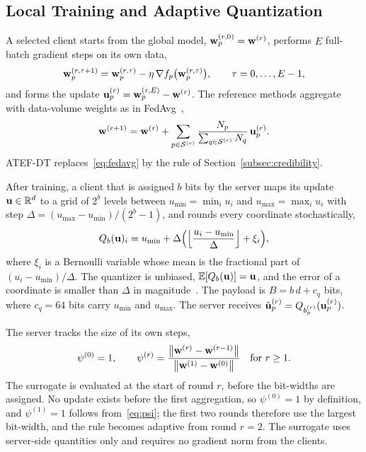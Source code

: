 \subsection{Local Training and Adaptive Quantization}
\label{subsec:quant}\label{subsec:local}
A selected client starts from the global model, $\mathbf{w}_p^{(r,0)}=\mathbf{w}^{(r)}$, performs $E$ full-batch gradient steps on its own data,
\begin{equation}
	\mathbf{w}_p^{(r,\tau+1)}=\mathbf{w}_p^{(r,\tau)}-\eta\,\nabla f_p\bigl(\mathbf{w}_p^{(r,\tau)}\bigr),\qquad \tau=0,\dots,E-1,
	\label{eq:local}
\end{equation}
and forms the update $\mathbf{u}_p^{(r)}=\mathbf{w}_p^{(r,E)}-\mathbf{w}^{(r)}$. The reference methods aggregate with data-volume weights as in FedAvg~\cite{mcmahan2017communication},
\begin{equation}
	\mathbf{w}^{(r+1)}=\mathbf{w}^{(r)}+\sum_{p\in\mathcal{S}^{(r)}}\frac{N_p}{\sum_{q\in\mathcal{S}^{(r)}}N_q}\,\mathbf{u}_p^{(r)} .
	\label{eq:fedavg}
\end{equation}
ATEF-DT replaces~\eqref{eq:fedavg} by the rule of Section~\ref{subsec:credibility}.

After training, a client that is assigned $b$ bits by the server maps its update $\mathbf{u}\in\mathbb{R}^d$ to a grid of $2^b$ levels between $u_{\min}=\min_i u_i$ and $u_{\max}=\max_i u_i$ with step $\Delta=(u_{\max}-u_{\min})/(2^b-1)$, and rounds every coordinate stochastically,
\begin{equation}
	Q_b(\mathbf{u})_i=u_{\min}+\Delta\Bigl(\Bigl\lfloor\frac{u_i-u_{\min}}{\Delta}\Bigr\rfloor+\xi_i\Bigr),
	\label{eq:quant}
\end{equation}
where $\xi_i$ is a Bernoulli variable whose mean is the fractional part of $(u_i-u_{\min})/\Delta$. The quantizer is unbiased, $\mathbb{E}[Q_b(\mathbf{u})]=\mathbf{u}$, and the error of a coordinate is smaller than $\Delta$ in magnitude~\cite{alistarh2017qsgd}. The payload is $B=b\,d+c_q$ bits, where $c_q=64$ bits carry $u_{\min}$ and $u_{\max}$. The server receives $\hat{\mathbf{u}}_p^{(r)}=Q_{b_p^{(r)}}(\mathbf{u}_p^{(r)})$.

\begin{revblock}The server tracks the size of its own steps,
\begin{equation}
	\psi^{(0)}=1,\qquad \psi^{(r)}=\frac{\left\lVert \mathbf{w}^{(r)}-\mathbf{w}^{(r-1)} \right\rVert}{\left\lVert \mathbf{w}^{(1)}-\mathbf{w}^{(0)} \right\rVert}\quad\text{for } r\ge 1 .
	\label{eq:psi}
\end{equation}
The surrogate is evaluated at the start of round $r$, before the bit-widths are assigned. No update exists before the first aggregation, so $\psi^{(0)}=1$ by definition, and $\psi^{(1)}=1$ follows from~\eqref{eq:psi}; the first two rounds therefore use the largest bit-width, and the rule becomes adaptive from round $r=2$. The surrogate uses server-side quantities only and requires no gradient norm from the clients.\end{revblock}

